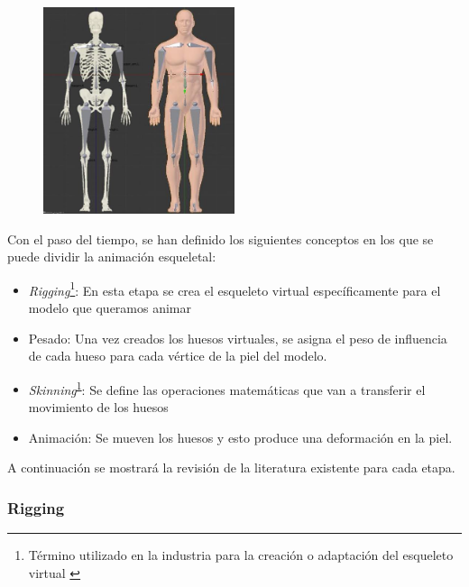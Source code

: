 \begin{figure}[h]
   \centering
    \includegraphics[width=0.5\textwidth]{IMG/virtualskeleton.png}
    \caption{ }
   \label{fig:zygoteproblems}
\end{figure}

Con el paso del tiempo, se han definido los siguientes conceptos en los que se puede dividir la animación esqueletal:

\begin{itemize}
    \item \emph{Rigging}\footnote{Término utilizado en la industria para la creación o adaptación del esqueleto virtual \label{footnote1}}: En esta etapa se crea el esqueleto virtual específicamente para el modelo que queramos animar
    \item Pesado: Una vez creados los huesos virtuales, se asigna el peso de influencia de cada hueso para cada vértice de la piel del modelo.
    \item \emph{Skinning}\textsuperscript{\ref{footnote1}}: Se define las operaciones matemáticas que van a transferir el movimiento de los huesos 
    \item Animación: Se mueven los huesos y esto produce una deformación en la piel.
\end{itemize}

A continuación se mostrará la revisión de la literatura existente para cada etapa.
\subsubsection{Rigging}
\label{art:rigging}

